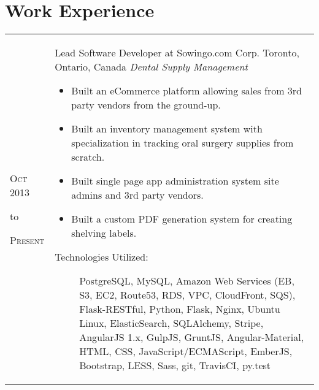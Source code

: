\documentclass[a4paper,10pt]{article}
\begin{document}
        \section{Work Experience}
        \begin{tabular}{ R{1.5cm} | p{10.5cm} }
            \hfill \textsc{Oct 2013}\newline
            \begin{center} to \end{center}
            \hfill \textsc{Present} &

            Lead Software Developer at Sowingo.com Corp.\newline
            Toronto, Ontario, Canada\newline
            \emph{Dental Supply Management} \newline
            \fontsize{9pt}{10pt}\selectfont
            \begin{itemize}
                \item Built an eCommerce platform allowing sales from 3rd party vendors from the ground-up.
                \item Built an inventory management system with specialization in tracking oral surgery supplies from scratch.
                \item Built single page app administration system site admins and 3rd party vendors.
                \item Built a custom PDF generation system for creating shelving labels.
            \end{itemize}
            \bigskip
            \begin{description}
                \item[Technologies Utilized:]
                    PostgreSQL, MySQL, Amazon Web Services (EB, S3, EC2,
                    Route53, RDS, VPC, CloudFront, SQS), Flask-RESTful, Python,
                    Flask, Nginx, Ubuntu Linux, ElasticSearch, SQLAlchemy,
                    Stripe, AngularJS 1.x, GulpJS, GruntJS, Angular-Material,
                    HTML, CSS, JavaScript/ECMAScript, EmberJS, Bootstrap, LESS,
                    Sass, git, TravisCI, py.test
            \end{description}
        \end{tabular}
        \\
\end{document}
